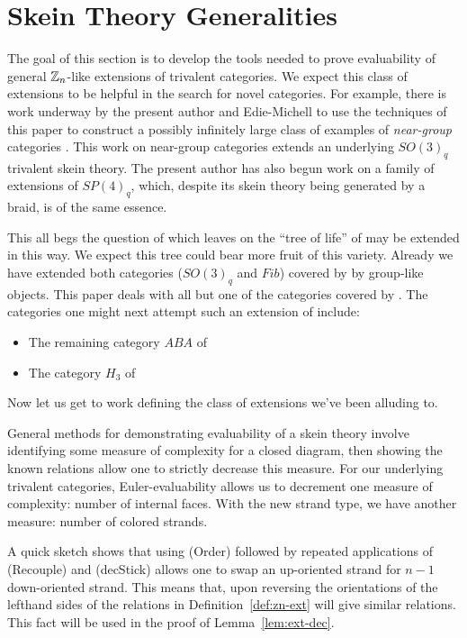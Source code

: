 \section{Skein Theory Generalities}\label{sec:skein}

The goal of this section is to develop the tools needed to prove evaluability of general $\mathbb{Z}_n$-like extensions of trivalent categories.
We expect this class of extensions to be helpful in the search for novel categories.
For example, there is work underway by the present author and Edie-Michell to use the techniques of this paper to 
construct a possibly infinitely large class of examples of {\it near-group} categories \cite{gannon_near-groups}.
This work on near-group categories \cite{cain_me_near_groups} extends an underlying $SO(3)_q$ trivalent skein theory.
The present author has also begun work \cite{me_sp4} on a family of extensions of $SP(4)_q$, which, despite its skein theory being
generated by a braid, is of the same essence. 


This all begs the question of which leaves on the ``tree of life'' of \cite{tricats} may be extended in this way.
We expect this tree could bear more fruit of this variety.
Already we have extended both categories ($SO(3)_q$ and $Fib$) covered by \cite[Theorem A]{tricats} by group-like objects.
This paper deals with all but one of the categories covered by \cite[Theorem B]{tricats}.
The categories one might next attempt such an extension of include:
\begin{itemize}
    \item The remaining category $ABA$ of \cite[Theorem B]{tricats}
    \item The category $H_3$ of \cite[Theorem C]{tricats}
\end{itemize}

Now let us get to work defining the class of extensions we've been alluding to.


General methods for demonstrating evaluability of a skein theory involve identifying some measure of complexity for a closed diagram, then showing the known relations allow one to strictly decrease this measure. 
For our underlying trivalent categories, Euler-evaluability allows us to decrement one measure of complexity: number of internal faces. 
With the new strand type, we have another measure: number of colored strands. 


\begin{remark}
    A quick sketch shows that using (Order) followed by repeated applications of (Recouple) and (decStick) 
    allows one to swap an up-oriented strand for $n-1$ down-oriented strand. 
    This means that, upon reversing the orientations of the lefthand sides of the relations in 
    Definition~\ref{def:zn-ext} will give similar relations.
    This fact will be used in the proof of Lemma~\ref{lem:ext-dec}.
\end{remark}


